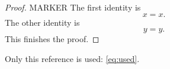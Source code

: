 \documentclass{article}
\newcommand{\fixtureprobe}{\iftrue\relax\fi}
\begin{document}
\begin{proof}
MARKER \fixtureprobe The first identity is
\begin{equation}\label{eq:used}
x=x.
\end{equation}
The other identity is
\begin{equation}\label{eq:unused}
y=y.
\end{equation}
This finishes the proof.
\end{proof}

Only this reference is used: \eqref{eq:used}.
\end{document}
